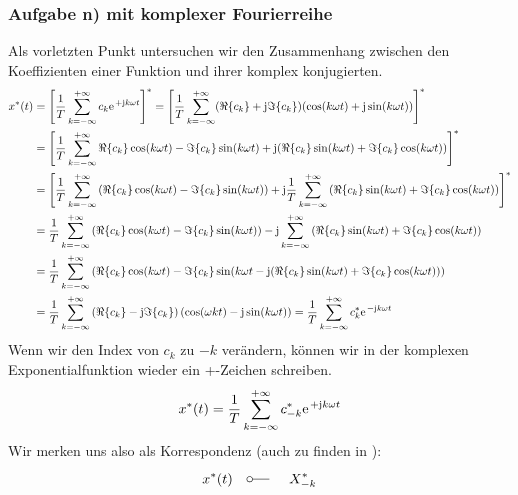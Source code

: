 \documentclass[11pt,a4paper,DIV=12]{scrartcl}
\begin{document}
\subsubsection*{Aufgabe n) mit komplexer Fourierreihe}
%
Als vorletzten Punkt untersuchen wir den Zusammenhang zwischen den Koeffizienten
einer Funktion und ihrer komplex konjugierten.
%
%
\begin{align}
	x^*(t)&=\left [\frac{1}{T}\sum_{k=-\infty}^{+\infty}c_k\e^{+\im k \omega t}\right ]^*=\left [\frac{1}{T}\sum_{k=-\infty}^{+\infty}(\Re\{c_k\}+\im\Im\{c_k\})(\cos(k\omega t)+\im\sin(k\omega t))\right ]^*\nonumber \\
	&=\left [\frac{1}{T}\sum_{k=-\infty}^{+\infty}\Re\{c_k\}\cos(k\omega t)-\Im\{c_k\}\sin(k\omega t)+\im (\Re\{c_k\}\sin(k\omega t)+\Im\{c_k\}\cos(k\omega t)) \right ]^*\nonumber \\
	&=\left [\frac{1}{T}\sum_{k=-\infty}^{+\infty}\left (\Re\{c_k\}\cos(k\omega t)-\Im\{c_k\}\sin(k\omega t)\right )+\im\frac{1}{T}\sum_{k=-\infty}^{+\infty}\left (\Re\{c_k\}\sin(k\omega t)+\Im\{c_k\}\cos(k\omega t)\right )\right ]^*\nonumber \\
	&=\frac{1}{T}\sum_{k=-\infty}^{+\infty}\left (\Re\{c_k\}\cos(k\omega t)-\Im\{c_k\}\sin(k\omega t)\right )-\im\sum_{k=-\infty}^{+\infty}\left (\Re\{c_k\}\sin(k\omega t)+\Im\{c_k\}\cos(k\omega t)\right )\nonumber \\
	&=\frac{1}{T}\sum_{k=-\infty}^{+\infty}\left (\Re\{c_k\}\cos(k\omega t)-\Im\{c_k\}\sin(k\omega t-\im(\Re\{c_k\}\sin(k\omega t)+\Im\{c_k\}\cos(k\omega t))\right )\nonumber \\
	\label{eq:ComplexConjugatedFourierSeries}
	&=\frac{1}{T}\sum_{k=-\infty}^{+\infty}\left(\Re\{c_k\}-\im\Im\{c_k\}\right)\left(\cos(\omega k t)-\im\sin(k\omega t) \right)=\frac{1}{T}\sum_{k=-\infty}^{+\infty}c_k^*\e^{-\im k \omega t}
\end{align}
%
%
%
Wenn wir den Index von $c_k$ zu $-k$ verändern, können wir in der komplexen
Exponentialfunktion wieder ein +-Zeichen schreiben.
%
%
\begin{align}
	x^*(t)=\frac{1}{T}\sum_{k=-\infty}^{+\infty}c_{-k}^*\e^{+\im k \omega t}
\end{align}
%
%
Wir merken uns also als Korrespondenz (auch zu finden in \cite[Kap. 3, S. 208]{Oppenheim1997}):
%
\begin{align}
	x^*(t)\quad\fourier\quad X_{-k}^*
\end{align}
%
\newpage
\end{document}
